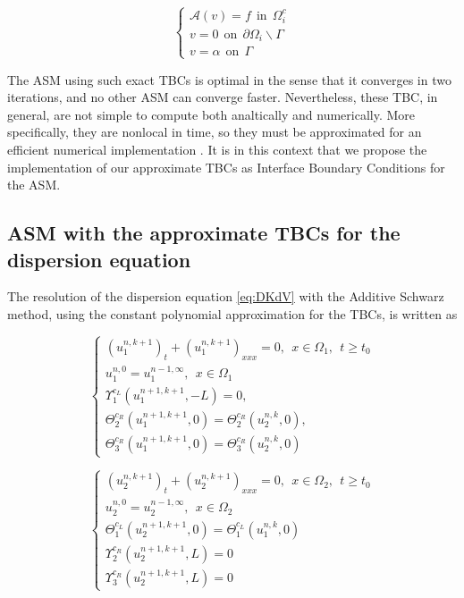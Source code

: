 \begin{equation*}
\begin{cases}
\mathcal{A}(v) = f \ \ \text{in} \ \ \Omega_i^c\\
v = 0 \ \ \text{on} \ \ \partial \Omega_i \backslash \Gamma \\
v = \alpha \ \ \text{on} \ \ \Gamma
\end{cases}
\end{equation*}

\indent The ASM using such exact TBCs is optimal in the sense that it converges in two iterations, and no other ASM can converge faster. Nevertheless, these TBC, in general, are not simple to compute both analtically and numerically. More specifically, they are nonlocal in time, so they must be approximated for an efficient numerical implementation \cite{Xavieretal2008}. It is in this context that we propose the implementation of our approximate TBCs as Interface Boundary Conditions for the ASM.

\subsection{ASM with the approximate TBCs for the dispersion equation}

\indent The resolution of the dispersion equation \eqref{eq:DKdV} with the Additive Schwarz method, using the constant polynomial approximation for the TBCs, is written as

\begin{equation}
    \label{eq:problemDDM1}
    \begin{cases}
        (u_1^{n,k+1})_t + (u_1^{n,k+1})_{xxx} = 0 , \ \ x \in \Omega_1, \ \ t \geq t_0\\
        u_1^{n,0} = u_1^{n-1,\infty} , \ \ x \in \Omega_1 \\
        \Upsilon_1^{c_L}(u_1^{n+1,k+1},-L) = 0, \\ 
        \Theta_2^{c_R}(u_1^{n+1,k+1},0) = \Theta_2^{c_R}(u_2^{n,k},0) , \\
        \Theta_3^{c_R}(u_1^{n+1,k+1},0) = \Theta_3^{c_R}(u_2^{n,k},0)
     \end{cases}
\end{equation}

\begin{equation}
    \label{eq:problemDDM2}
    \begin{cases}
        (u_2^{n,k+1})_t + (u_2^{n,k+1})_{xxx} = 0 , \ \ x \in \Omega_2, \ \ t \geq t_0\\
        u_2^{n,0} = u_2^{n-1,\infty} , \ \ x \in \Omega_2 \\
        \Theta_1^{c_L}(u_2^{n+1,k+1},0) = \Theta_1^{c_L}(u_1^{n,k},0) \\
        \Upsilon_2^{c_R}(u_2^{n+1,k+1},L) = 0 \\
        \Upsilon_3^{c_R}(u_2^{n+1,k+1},L) = 0
     \end{cases}
\end{equation}

